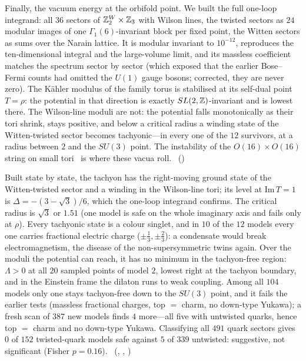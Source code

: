 Finally, the vacuum energy at the orbifold point. We built the full one-loop integrand: all $36$ sectors of
$\mathbb{Z}_2^W\times\mathbb{Z}_3$ with Wilson lines, the twisted sectors as $24$ modular images of one $\Gamma_1(6)$-invariant block
per fixed point, the Witten sectors as sums over the Narain lattice. It is modular invariant to $10^{-12}$, reproduces
the ten-dimensional integral and the large-volume limit, and its massless coefficient matches the spectrum sector by
sector (which exposed that the earlier Bose--Fermi counts had omitted the $U(1)$ gauge bosons; corrected, they are
never zero). The Kähler modulus of the family torus is stabilised at its self-dual point $T=\rho$: the potential in
that direction is exactly $SL(2,\mathbb{Z})$-invariant and is lowest there. The Wilson-line moduli are not: the potential
falls monotonically as their tori shrink, stays positive, and below a critical radius a winding state of the
Witten-twisted sector becomes tachyonic---in every one of the $12$ survivors, at a radius between $2$ and the $SU(3)$
point. The instability of the $O(16)\times O(16)$ string on small tori~\cite{GinspargVafa1987} is where these vacua
roll. \tierC\ ()

Built state by state, the tachyon has the right-moving ground state of the Witten-twisted sector and a winding in the
Wilson-line tori; its level at $\mathrm{Im}\,T=1$ is $\Delta=-(3-\sqrt3)/6$, which the one-loop integrand confirms. The
critical radius is $\sqrt3$ or $1.51$ (one model is safe on the whole imaginary axis and fails only at $\rho$). Every
tachyonic state is a colour singlet, and in $10$ of the $12$ models every one carries fractional electric charge
($\pm\frac13,\pm\frac23$): a condensate would break electromagnetism, the disease of the non-supersymmetric twins again.
Over the moduli the potential can reach, it has no minimum in the tachyon-free region: $\Lambda>0$ at all $20$ sampled
points of model $2$, lowest right at the tachyon boundary, and in the Einstein frame the dilaton runs to weak coupling.
Among all $104$ models only one stays tachyon-free down to the $SU(3)$ point, and it fails the earlier tests (massless
fractional charges, top $=$ charm, no down-type Yukawa); a fresh scan of $387$ new models finds
$4$ more---all five with untwisted quarks, hence top $=$ charm and no down-type Yukawa. Classifying all $491$ quark
sectors gives $0$ of $152$ twisted-quark models safe against $5$ of $339$ untwisted: suggestive, not significant (Fisher
$p=0.16$). \tierC\ (,
, )

